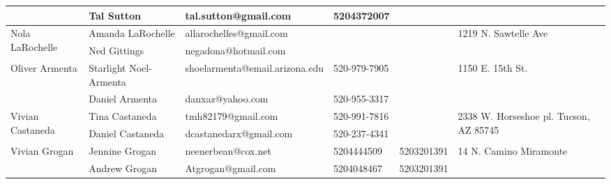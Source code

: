 \documentclass[landscape]{article}\usepackage[]{graphicx}\usepackage[]{color}
\begin{document}
\begin{longtable}{|p{100pt}|p{100pt}|p{140pt}|p{60pt}|p{64pt}|p{120pt}|}
 & Tal Sutton & tal.sutton@gmail.com & 5204372007 &  & \\
\hline
\multirow{2}{100pt}{Nola LaRochelle} & Amanda LaRochelle & allarochelles@gmail.com &  &  & \multirow{2}{120pt}{1219 N. Sawtelle Ave} \\
 & Ned Gittings & negadona@hotmail.com &  &  & \\
\hline
\multirow{2}{100pt}{Oliver Armenta} & Starlight Noel-Armenta & shoelarmenta@email.arizona.edu & 520-979-7905 &  & \multirow{2}{120pt}{1150 E. 15th St.} \\
 & Daniel Armenta & danxaz@yahoo.com & 520-955-3317 &  & \\
\hline
\multirow{2}{100pt}{Vivian Castaneda} & Tina Castaneda & tmh82179@gmail.com & 520-991-7816 &  & \multirow{2}{120pt}{2338 W. Horseshoe pl. Tucson, AZ 85745} \\
 & Daniel Castaneda & dcastanedarx@gmail.com & 520-237-4341 &  & \\
\hline
\multirow{2}{100pt}{Vivian Grogan} & Jennine Grogan & neenerbean@cox.net & 5204444509 & 5203201391 & \multirow{2}{120pt}{14 N. Camino Miramonte} \\
 & Andrew Grogan  & Atgrogan@gmail.com  & 5204048467 & 5203201391 & \\
\hline
\end{longtable}
\newpage
\end{document}
